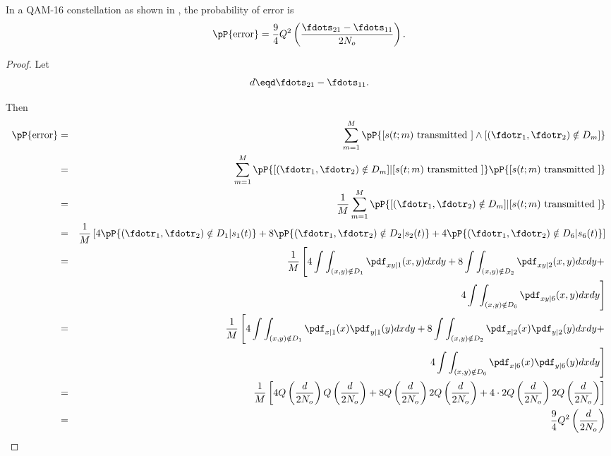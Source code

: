 \begin{theorem}
In a QAM-16 constellation as shown in ,
the probability of error is
\[ \pP{\mbox{error}} = \frac{9}{4} Q^2\left(\frac{\fdots_{21}-\fdots_{11}}{2N_o}\right).\]
\end{theorem}

\begin{proof}
Let 
\[ d \eqd \fdots_{21}-\fdots_{11}.\]

Then
\begin{eqnarray*}
   \pP{\mbox{error}}
     &=& \sum_{m=1}^M \pP{[s(t;m)\mbox{ transmitted }]\land
                            [(\fdotr_1,\fdotr_2)\notin D_m] }
   \\&=& \sum_{m=1}^M \pP{[(\fdotr_1,\fdotr_2)\notin D_m]|
                            [s(t;m)\mbox{ transmitted }] }
                      \pP{[s(t;m)\mbox{ transmitted }]}
   \\&=& \frac{1}{M}
         \sum_{m=1}^M \pP{[(\fdotr_1,\fdotr_2)\notin D_m]|
                            [s(t;m)\mbox{ transmitted }] }
   \\&=& \frac{1}{M}\left[
         4 \pP{(\fdotr_1,\fdotr_2)\notin D_1 | s_1(t)} +
         8 \pP{(\fdotr_1,\fdotr_2)\notin D_2 | s_2(t)} +
         4 \pP{(\fdotr_1,\fdotr_2)\notin D_6 | s_6(t)} 
         \right]
   \\&=& \frac{1}{M}\left[
         4 \int\int_{(x,y)\notin D_1} \pdf_{xy|1}(x,y) dxdy +
         8 \int\int_{(x,y)\notin D_2} \pdf_{xy|2}(x,y) dxdy + \right.
         \\&& \left.4 \int\int_{(x,y)\notin D_6} \pdf_{xy|6}(x,y) dxdy
         \right]
   \\&=& \frac{1}{M}\left[
         4 \int\int_{(x,y)\notin D_1} \pdf_{x|1}(x) \pdf_{y|1}(y) dxdy +
         8 \int\int_{(x,y)\notin D_2} \pdf_{x|2}(x) \pdf_{y|2}(y) dxdy + \right.
         \\&& \left.4 \int\int_{(x,y)\notin D_6} \pdf_{x|6}(x) \pdf_{y|6}(y) dxdy
         \right]
   \\&=& \frac{1}{M} \left[
         4 Q\left(\frac{d}{2N_o}\right) Q\left(\frac{d}{2N_o}\right) + 
         8 Q\left(\frac{d}{2N_o}\right) 2Q\left(\frac{d}{2N_o}\right) + 
         4\cdot2 Q\left(\frac{d}{2N_o}\right) 2Q\left(\frac{d}{2N_o}\right) 
         \right]
   \\&=& \frac{9}{4} Q^2\left(\frac{d}{2N_o}\right)
\end{eqnarray*}
\end{proof}







